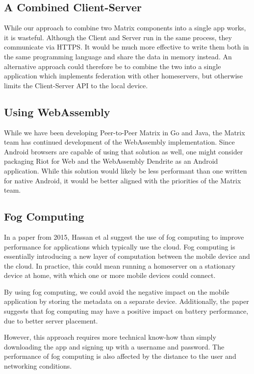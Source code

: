 \subsection{A Combined Client-Server}\label{subsec:combined_client_server}
While our approach to combine two Matrix components into a single app works, it is wasteful.
Although the Client and Server run in the same process, they communicate via HTTPS\@.
It would be much more effective to write them both in the same programming language and share the data in memory instead.
An alternative approach could therefore be to combine the two into a single application which implements federation with other homeservers, but otherwise limits the Client-Server API to the local device.

\subsection{Using WebAssembly}\label{subsec:using_webassembly}
While we have been developing Peer-to-Peer Matrix in Go and Java, the Matrix team has continued development of the WebAssembly implementation.
Since Android browsers are capable of using that solution as well, one might consider packaging Riot for Web and the WebAssembly Dendrite as an Android application.
While this solution would likely be less performant than one written for native Android, it would be better aligned with the priorities of the Matrix team.

\subsection{Fog Computing}\label{sec:fog_computing}
In a paper from 2015, Hassan et al suggest the use of fog computing to improve performance for applications which typically use the cloud\cite{hassan2015help}.
Fog computing is essentially introducing a new layer of computation between the mobile device and the cloud.
In practice, this could mean running a homeserver on a stationary device at home, with which one or more mobile devices could connect.

By using fog computing, we could avoid the negative impact on the mobile application by storing the metadata on a separate device.
Additionally, the paper suggests that fog computing may have a positive impact on battery performance, due to better server placement.

However, this approach requires more technical know-how than simply downloading the app and signing up with a username and password.
The performance of fog computing is also affected by the distance to the user and networking conditions.
